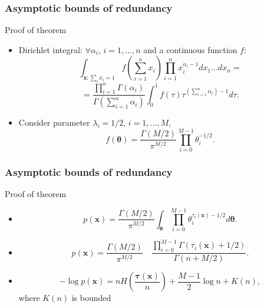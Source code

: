 \documentclass[14pt]{beamer}
\renewcommand{\vec}[1]{\ensuremath{\boldsymbol{#1}}}
\begin{document}
\begin{frame}
\frametitle{Asymptotic bounds of redundancy}
Proof of theorem
\begin{itemize}    

    \item Dirichlet integral: $\forall \alpha_i$, $i=1,...,n$ and a continuous function $f$:
    \[
    \int_{\vec x: \sum_i x_i=1}{f\left(\sum_{i=1}^n x_i\right)}%
    \prod_{i=1}^{n} x_i^{\alpha_i -1} dx_1...dx_n=
    \]
    \begin{equation}
    \label{Dirichlet}%
    =\frac{\prod_{i=1}^{n}{\Gamma(\alpha_i)}}{\Gamma{\left(\sum_{i=1}^n
    \alpha_i\right)}}%
    \int_{0}^{1}f(\tau) \tau^{\left(\sum_{i=1}^n \alpha_i\right) -1} d
    \tau .
    \end{equation}


    \item Consider parameter $\lambda_i=1/2$, $i=1,...,M$,
    \begin{equation}
    \label{FDirichlet2} f(\vec \theta)=\frac{\Gamma(M/2)}{\pi^{M/2}} \prod_{i=0}^{M-1} \theta_i^{-1/2} .
    \end{equation}

\end{itemize}
\end{frame}


\begin{frame}
\frametitle{Asymptotic bounds of redundancy}
Proof of theorem
\begin{itemize}    

    \item 
    \[
    p(\vec x)=\frac{\Gamma(M/2)}{\pi^{M/2}}\int_{\vec
    \theta}\prod_{i=0}^{M-1} \theta_i^{\tau_i(\vec x) -1/2} d \vec
    \theta .
    \]

    \item 
    \begin{equation}
    \label{probx} %
    p(\vec x)=\frac{\Gamma(M/2)}{\pi^{M/2}}%
    \quad \frac{\prod_{i=0}^{M-1} \Gamma (\tau_i(\vec x) + 1/2 )} %
    {\Gamma (n+M/2)} .
    \end{equation}


    \item
    \begin{equation}
    \label{logprobx} %
    -\log p(\vec x)= n H \left ( \frac {\vec \tau (\vec x)}{n} \right)%
    + \frac {M-1}{2} \log n + K(n),
    \end{equation}
    where $K(n)$ is bounded
    
\end{itemize}
\end{frame}
\end{document}
